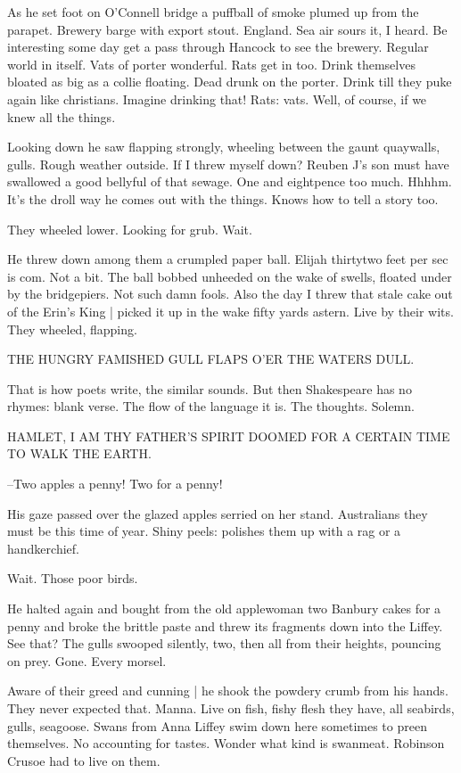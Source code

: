 As he set foot on O'Connell bridge
a puffball of smoke plumed up from the parapet.
Brewery barge with export stout.
England.
Sea air sours it, I heard.
Be interesting some day get a pass through Hancock to see the brewery.
Regular world in itself.
Vats of porter wonderful.
Rats get in too.
Drink themselves bloated as big as a collie floating.
Dead drunk on the porter.
Drink till they puke again like christians.
Imagine drinking that!
Rats: vats.
Well, of course,
if we knew all the things.

Looking down
he saw flapping strongly,
wheeling between the gaunt quaywalls,
gulls.
Rough weather outside.
If I threw myself down?
Reuben J's son must have swallowed a good bellyful of that sewage.
One and eightpence too much.
Hhhhm.
It's the droll way he comes out with the things.
Knows how to tell a story too.

They wheeled lower.
Looking for grub.
Wait.

He threw down among them a crumpled paper ball.
Elijah thirtytwo feet per sec is com.
Not a bit.
The ball bobbed unheeded on the wake of swells,
floated under by the bridgepiers.
Not such damn fools.
Also the day I threw that stale cake out of the Erin's King |
picked it up in the wake fifty yards astern.
Live by their wits.
They wheeled,
flapping.

    THE HUNGRY FAMISHED GULL
    FLAPS O'ER THE WATERS DULL.

That is how poets write, the similar sounds.
But then Shakespeare has no rhymes:
blank verse.
The flow of the language it is.
The thoughts.
Solemn.

    HAMLET, I AM THY FATHER'S SPIRIT
    DOOMED FOR A CERTAIN TIME TO WALK THE EARTH.

--Two apples a penny!
Two for a penny!

His gaze passed over the glazed apples serried on her stand.
Australians they must be this time of year.
Shiny peels:
polishes them up
with a rag or a handkerchief.

Wait.
Those poor birds.

He halted again and bought from the old applewoman
two Banbury cakes for a penny
and broke the brittle paste
and threw its fragments down into the Liffey.
See that?
The gulls swooped silently,
two,
then all from their heights,
pouncing on prey.
Gone.
Every morsel.

Aware of their greed and cunning |
he shook the powdery crumb from his hands.
They never expected that.
Manna.
Live on fish,
fishy flesh they have,
all seabirds,
gulls,
seagoose.
Swans from Anna Liffey swim down here sometimes to preen themselves.
No accounting for tastes.
Wonder what kind is swanmeat.
Robinson Crusoe had to live on them.

